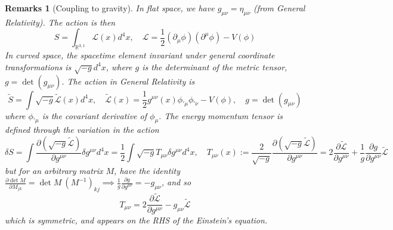 \documentclass[a4paper]{article}
\newtheorem{remarks}{Remarks}[section]
\theoremstyle{new}
\begin{document}
\begin{remarks}[Coupling to gravity]
In flat space, we have $g_{\mu\nu}=\eta_{\mu\nu}$ (from General Relativity). The action is then
$$S=\int_{\mathbb{R}^{3,1}}\mathcal{L}(x)d^4x,\quad\mathcal{L}=\frac{1}{2}(\partial_\mu\phi)(\partial^\mu\phi)-V(\phi)$$
In curved space, the spacetime element invariant under general coordinate transformations is $\sqrt{-g}d^4x$, where $g$ is the determinant of the metric tensor, $g=\det(g_{\mu\nu})$. The action in General Relativity is
$$\tilde{S}=\int\sqrt{-g}\tilde{\mathcal{L}}(x)d^4x,\quad \tilde{\mathcal{L}}(x)=\frac{1}{2}g^{\mu\nu}(x)\phi_{'\mu}\phi_{'\nu}-V(\phi),\quad g=\det(g_{\mu\nu})$$
where $\phi_{'\mu}$ is the covariant derivative of $\phi_\mu$. The energy momentum tensor is defined through the variation in the action
$$\delta S=\int\frac{\partial(\sqrt{-g}\tilde{\mathcal{L}})}{\partial g^{\mu\nu}}\delta g^{\mu\nu}d^4x=\frac{1}{2}\int \sqrt{-g}T_{\mu\nu}\delta g^{\mu\nu}d^4x,\quad T_{\mu\nu}(x):=\frac{2}{\sqrt{-g}}\frac{\partial(\sqrt{-g}\tilde{\mathcal{L}})}{\partial g^{\mu\nu}}=2\frac{\partial\mathcal{\tilde{L}}}{\partial g^{\mu\nu}}+\frac{1}{g}\frac{\partial g}{\partial g^{\mu\nu}}\mathcal{\tilde{L}}$$
but for an arbitrary matrix $M$, have the identity $\frac{\partial\det M}{\partial M_{jk}}=\det M~(M^{-1})_{kj}\implies\frac{1}{g}\frac{\partial g}{\partial g^{\mu\nu}}=-g_{\mu\nu}$, and so
$$T_{\mu\nu}=2\frac{\partial\mathcal{\tilde{L}}}{\partial g^{\mu\nu}}-g_{\mu\nu}\mathcal{\tilde{L}}$$
which is symmetric, and appears on the RHS of the Einstein's equation.
\end{remarks}
\end{document}
